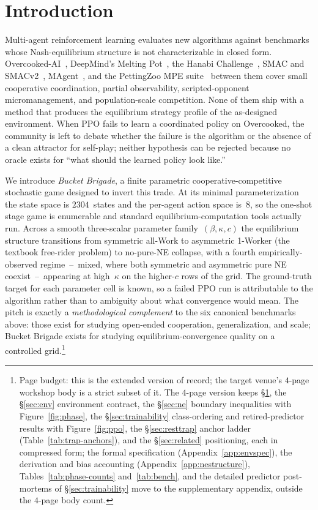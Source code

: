 \documentclass{anvil-paper}
\begin{document}
\section{Introduction}
\label{sec:intro}

Multi-agent reinforcement learning evaluates new algorithms against benchmarks
whose Nash-equilibrium structure is not characterizable in closed form.
Overcooked-AI~\citep{overcooked2019}, DeepMind's Melting
Pot~\citep{meltingpot2021}, the Hanabi
Challenge~\citep{hanabi2020}, SMAC and SMACv2~\citep{smac2019,smacv2_2023},
MAgent~\citep{magent2018}, and the PettingZoo MPE
suite~\citep{pettingzoo2021} between them cover small cooperative
coordination, partial observability, scripted-opponent micromanagement, and
population-scale competition. None of them ship with a method that produces
the equilibrium strategy profile of the as-designed environment. When PPO
fails to learn a coordinated policy on Overcooked, the community is left to
debate whether the failure is the algorithm or the absence of a clean
attractor for self-play; neither hypothesis can be rejected because no oracle
exists for ``what should the learned policy look like.''

We introduce \emph{Bucket Brigade}, a finite parametric cooperative-competitive
stochastic game designed to invert this trade. At its minimal parameterization
the state space is $2304$~states and the per-agent action space is~$8$, so the
one-shot stage game is enumerable and standard equilibrium-computation tools
actually run. Across a smooth three-scalar parameter family~$(\beta,\kappa,c)$
the equilibrium structure transitions from symmetric all-Work to asymmetric
1-Worker (the textbook free-rider problem) to no-pure-NE collapse, with a
fourth empirically-observed regime~--~\textsf{mixed}, where both symmetric
and asymmetric pure NE coexist~--~appearing at high~$\kappa$ on the
higher-$c$ rows of the grid. The ground-truth target for each parameter cell
is known, so a failed PPO run is attributable to the algorithm rather than
to ambiguity about what convergence would mean. The pitch is exactly a
\emph{methodological complement} to the six canonical benchmarks above: those
exist for studying open-ended cooperation, generalization, and scale; Bucket
Brigade exists for studying equilibrium-convergence quality on a controlled
grid.\footnote{Page budget: this is the extended version of record; the
target venue's $4$-page workshop body is a strict subset of it. The
$4$-page version keeps \S\ref{sec:intro}, the \S\ref{sec:env}
environment contract, the \S\ref{sec:ne} boundary inequalities with
Figure~\ref{fig:phase}, the \S\ref{sec:trainability} class-ordering
and retired-predictor results with Figure~\ref{fig:ppo}, the
\S\ref{sec:resttrap} anchor ladder (Table~\ref{tab:trap-anchors}),
and the \S\ref{sec:related} positioning, each in compressed form; the
formal specification (Appendix~\ref{app:envspec}), the derivation and
bias accounting (Appendix~\ref{app:nestructure}),
Tables~\ref{tab:phase-counts} and~\ref{tab:bench}, and the detailed
predictor post-mortems of \S\ref{sec:trainability} move to the
supplementary appendix, outside the $4$-page body count.}
\end{document}
